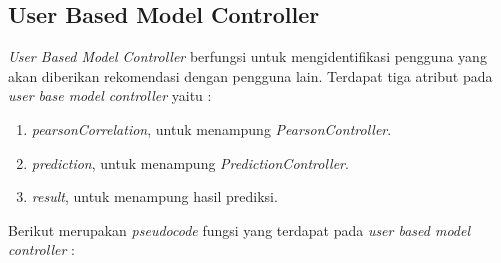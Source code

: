 \subsection{User Based Model Controller}
\label{subsec:user-based}

\textit{User Based Model Controller} berfungsi untuk mengidentifikasi pengguna yang akan diberikan rekomendasi dengan pengguna lain. Terdapat tiga atribut pada \textit{user base model controller} yaitu :

\begin{enumerate}
    \item \textit{pearsonCorrelation}, untuk menampung \textit{PearsonController}.
    
    \item \textit{prediction}, untuk menampung \textit{PredictionController}.
    
    \item \textit{result}, untuk menampung hasil prediksi.
\end{enumerate}

Berikut merupakan \textit{pseudocode} fungsi yang terdapat pada \textit{user based model controller} : 

